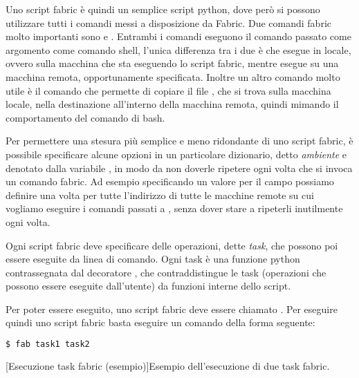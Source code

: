             Uno script fabric è quindi un semplice script python, dove però si possono utilizzare tutti i comandi messi a disposizione da Fabric. Due comandi fabric molto importanti sono  e . Entrambi i comandi eseguono il comando  passato come argomento come comando shell, l'unica differenza tra i due è che  esegue  in locale, ovvero sulla macchina che sta eseguendo lo script fabric, mentre  esegue  su una macchina remota, opportunamente specificata. Inoltre un altro comando molto utile è il comando  che permette di copiare il file , che si trova sulla macchina locale, nella destinazione  all'interno della macchina remota, quindi mimando il comportamento del comando  di bash.
            
            Per permettere una stesura più semplice e meno ridondante di uno script fabric, è possibile specificare alcune opzioni in un particolare dizionario, detto \textit{ambiente} e denotato dalla variabile , in modo da non doverle ripetere ogni volta che si invoca un comando fabric. Ad esempio specificando un valore per il campo  possiamo definire una volta per tutte l'indirizzo di tutte le macchine remote su cui vogliamo eseguire i comandi passati a , senza dover stare a ripeterli inutilmente ogni volta.
            
            Ogni script fabric deve specificare delle operazioni, dette \textit{task}, che possono poi essere eseguite da linea di comando. Ogni task è una funzione python contrassegnata dal decoratore , che contraddistingue le task (operazioni che possono essere eseguite dall'utente) da funzioni interne dello script.
            
            Per poter essere eseguito, uno script fabric deve essere chiamato . Per eseguire quindi uno script fabric basta eseguire un comando della forma seguente:
            
            \begin{center}
                \begin{lstlisting}[language=bash, gobble=18]
                    $ fab task1 task2
                \end{lstlisting}
                \captionsetup{textformat=empty,labelformat=empty} \vspace{-2em}
                [Esecuzione task fabric (esempio)]{Esempio dell'esecuzione di due task fabric.}
            \end{center}
            
